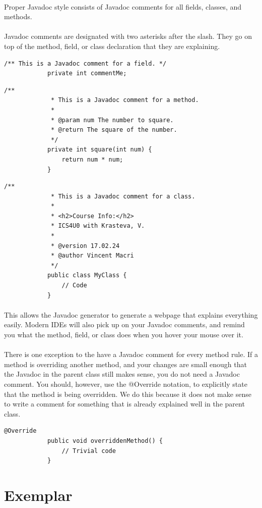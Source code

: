 \documentclass[12pt, letterpaper]{article}
\begin{document}
		\paragraph{}
			Proper Javadoc style consists of Javadoc comments for all fields, classes, and methods.
		\paragraph{}
			Javadoc comments are designated with two asterisks after the slash. They go on top of the method, field, or class declaration that they are explaining.
		\begin{lstlisting}[style=javasnippet]
			/** This is a Javadoc comment for a field. */
			private int commentMe;
		\end{lstlisting}
		\begin{lstlisting}[style=javasnippet]
			/**
			 * This is a Javadoc comment for a method.
			 *
			 * @param num The number to square.
			 * @return The square of the number.
			 */
			private int square(int num) {
				return num * num;
			}
		\end{lstlisting}
		\begin{lstlisting}[style=javasnippet]
			/**
			 * This is a Javadoc comment for a class.
			 * 
			 * <h2>Course Info:</h2>
			 * ICS4U0 with Krasteva, V.
			 * 
			 * @version 17.02.24
			 * @author Vincent Macri
			 */
			public class MyClass {
				// Code
			}
		\end{lstlisting}
		\paragraph{}
			This allows the Javadoc generator to generate a webpage that explains everything easily. Modern IDEs will also pick up on your Javadoc comments, and remind you what the method, field, or class does when you hover your mouse over it.
		\paragraph{}
			There is one exception to the have a Javadoc comment for every method rule. If a method is overriding another method, and your changes are small enough that the Javadoc in the parent class still makes sense, you do not need a Javadoc comment. You should, however, use the @Override notation, to explicitly state that the method is being overridden. We do this because it does not make sense to write a comment for something that is already explained well in the parent class.
		\begin{lstlisting}[style=javasnippet]
			@Override
			public void overriddenMethod() {
				// Trivial code
			}
		\end{lstlisting}
	\newpage
	\section{Exemplar}
		
\end{document}
